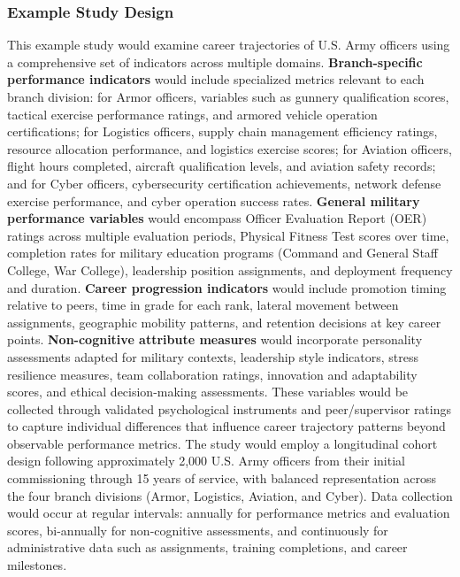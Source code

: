 \documentclass[main.tex]{subfiles}
\begin{document}
\subsubsection{Example Study Design}
This example study would examine career trajectories of U.S. Army officers using a comprehensive set of indicators across multiple domains. \textbf{Branch-specific performance indicators} would include specialized metrics relevant to each branch division: for Armor officers, variables such as gunnery qualification scores, tactical exercise performance ratings, and armored vehicle operation certifications; for Logistics officers, supply chain management efficiency ratings, resource allocation performance, and logistics exercise scores; for Aviation officers, flight hours completed, aircraft qualification levels, and aviation safety records; and for Cyber officers, cybersecurity certification achievements, network defense exercise performance, and cyber operation success rates.
\textbf{General military performance variables} would encompass Officer Evaluation Report (OER) ratings across multiple evaluation periods, Physical Fitness Test scores over time, completion rates for military education programs (Command and General Staff College, War College), leadership position assignments, and deployment frequency and duration. \textbf{Career progression indicators} would include promotion timing relative to peers, time in grade for each rank, lateral movement between assignments, geographic mobility patterns, and retention decisions at key career points.
\textbf{Non-cognitive attribute measures} would incorporate personality assessments adapted for military contexts, leadership style indicators, stress resilience measures, team collaboration ratings, innovation and adaptability scores, and ethical decision-making assessments. These variables would be collected through validated psychological instruments and peer/supervisor ratings to capture individual differences that influence career trajectory patterns beyond observable performance metrics.
The study would employ a longitudinal cohort design following approximately 2,000 U.S. Army officers from their initial commissioning through 15 years of service, with balanced representation across the four branch divisions (Armor, Logistics, Aviation, and Cyber). Data collection would occur at regular intervals: annually for performance metrics and evaluation scores, bi-annually for non-cognitive assessments, and continuously for administrative data such as assignments, training completions, and career milestones.
\end{document}
